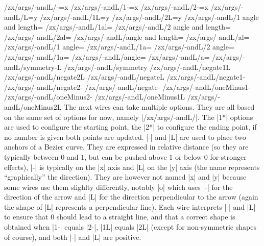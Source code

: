 \documentclass[a4paper,doc2]{ltxdoc} %
\begin{document}
{\begin{pgfmanualentry}
  \makeatletter
  \def\extrakeytext{style, }
  \extractkey/zx/args/-andL/-=x\@nil%
  \extractkey/zx/args/-andL/1-=x\@nil%
  \extractkey/zx/args/-andL/2-=x\@nil%
  \extractkey/zx/args/-andL/L=y\@nil%
  \extractkey/zx/args/-andL/1L=y\@nil%
  \extractkey/zx/args/-andL/2L=y\@nil%
  \extractkey/zx/args/-andL/1 angle and length=\@nil%
  \extractkey/zx/args/-andL/1al=\@nil%
  \extractkey/zx/args/-andL/2 angle and length=\@nil%
  \extractkey/zx/args/-andL/2al=\@nil%
  \extractkey/zx/args/-andL/angle and length=\@nil%
  \extractkey/zx/args/-andL/al=\@nil%
  \extractkey/zx/args/-andL/1 angle=\@nil%
  \extractkey/zx/args/-andL/1a=\@nil%
  \extractkey/zx/args/-andL/2 angle=\@nil%
  \extractkey/zx/args/-andL/1a=\@nil%
  \extractkey/zx/args/-andL/angle=\@nil%
  \extractkey/zx/args/-andL/a=\@nil%
  \extractkey/zx/args/-andL/symmetry-L\@nil%
  \extractkey/zx/args/-andL/symmetry\@nil%
  \extractkey/zx/args/-andL/negate1L\@nil%
  \extractkey/zx/args/-andL/negate2L\@nil%
  \extractkey/zx/args/-andL/negateL\@nil%
  \extractkey/zx/args/-andL/negate1-\@nil%
  \extractkey/zx/args/-andL/negate2-\@nil%
  \extractkey/zx/args/-andL/negate-\@nil%
  \extractkey/zx/args/-andL/oneMinus1-\@nil%
  \extractkey/zx/args/-andL/oneMinus2-\@nil%
  \extractkey/zx/args/-andL/oneMinus1L\@nil%
  \extractkey/zx/args/-andL/oneMinus2L\@nil%
  \makeatother
  \pgfmanualbody
  The next wires can take multiple options. They are all based on the same set of options for now, namely |/zx/args/-andL/|. The |1*| options are used to configure the starting point, the |2*| to configure the ending point, if no number is given both points are updated. |-| and |L| are used to place two anchors of a Bezier curve. They are expressed in relative distance (so they are typically between $0$ and $1$, but can be pushed above $1$ or below $0$ for stronger effects), |-| is typically on the |x| axis and |L| on the |y| axis (the name represents ``graphically'' the direction). They are however not named |x| and |y| because some wires use them slighlty differently, notably |o| which uses |-| for the direction of the arrow and |L| for the direction perpendicular to the arrow (again the shape of |L| represents a perpendicular line). Each wire interprets |-| and |L| to ensure that $0$ should lead to a straight line, and that a correct shape is obtained when |1-| equals |2-|, |1L| equals |2L| (except for non-symmetric shapes of course), and both |-| and |L| are positive.


\end{pgfmanualentry}}
\end{document}

